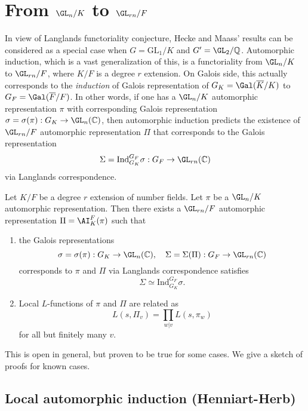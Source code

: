 \section{From $\GL_{n}/K$ to $\GL_{rn}/F$}
In view of Langlands functoriality conjecture, Hecke and Maass' results can be considered as a special case when $G = \mathrm{GL}_{1} / K$ and $G' = \GL_{2}/\mathbb{Q}$. 
Automorphic induction, which is a vast generalization of this, is a functoriality from $\GL_{n}/K$ to $\GL_{rn}/F$, where $K/F$ is a degree $r$ extension.
On Galois side, this actually corresponds to the \emph{induction} of Galois representation of $G_{K} = \Gal(\overline{K}/K)$ to $G_{F} = \Gal(\overline{F}/F)$.
In other words, if one has a $\GL_{n}/K$ automorphic representation $\pi$ with corresponding Galois representation $\sigma = \sigma(\pi): G_{K} \to \GL_{n}(\mathbb{C})$, 
then automorphic induction predicts the existence of $\GL_{rn}/F$ automorphic representation $\Pi$ that corresponds to the Galois representation
$$
\Sigma = \mathrm{Ind}_{G_{K}}^{G_{F}} \sigma : G_{F} \to \GL_{rn}(\mathbb{C})
$$
via Langlands correspondence.

\begin{conjecture}
Let $K/F$ be a degree $r$ extension of number fields. 
Let $\pi$ be a $\GL_{n}/K$ automorphic representation. 
Then there exists a $\GL_{rn}/F$ automorphic representation $\Pi = \AI_{K}^{F}(\pi)$ such that 
\begin{enumerate}
    \item the Galois representations 
    $$
    \sigma = \sigma(\pi): G_{K} \to \GL_{n}(\mathbb{C}), \quad \Sigma = \Sigma(\Pi): G_{F} \to \GL_{rn}(\mathbb{C})
    $$
    corresponds to $\pi$ and $\Pi$ via Langlands correspondence satisfies 
    $$
    \Sigma \simeq \mathrm{Ind}_{G_{K}}^{G_{F}} \sigma.
    $$
    \item Local $L$-functions of $\pi$ and $\Pi$ are related as
    $$
    L(s, \Pi_{v}) = \prod_{w|v} L(s, \pi_{w})
    $$
    for all but finitely many $v$. 
\end{enumerate}
\end{conjecture}

This is open in general, but proven to be true for some cases.
We give a sketch of proofs for known cases.

\subsection{Local automorphic induction (Henniart-Herb)}


